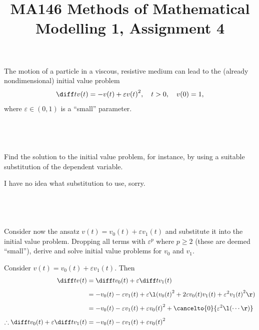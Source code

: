 \documentclass[a4paper]{article}
\title{MA146 Methods of Mathematical Modelling 1, Assignment 4}
\begin{document}
\maketitle

\setlength{\parindent}{0em}
\setlength{\parskip}{1em}


\begin{questionbody}
The motion of a particle in a viscous, resistive medium can lead to the (already nondimensional) initial value problem \[
\diff t v(t) = -v(t) + \varepsilon {v(t)}^2, \quad t > 0, \quad v(0) = 1,
\] where $\varepsilon \in (0, 1)$ is a \enquote{small} parameter.
\end{questionbody}

\subsection{~} %

\begin{questionbody}
Find the solution to the initial value problem, for instance, by using a suitable substitution of the dependent variable.
\end{questionbody}

I have no idea what substitution to use, sorry.

\subsection{~} %

\begin{questionbody}
Consider now the ansatz $v(t) = v_0(t) + \varepsilon v_1(t)$ and substitute it into the initial value problem. Dropping all terms with $\varepsilon^p$ where $p \ge 2$ (these are deemed \enquote{small}), derive and solve initial value problems for $v_0$ and $v_1$.
\end{questionbody}

Consider $v(t) = v_0(t) + \varepsilon v_1(t)$. Then \begin{align*}
    \diff t v(t) &= \diff t v_0(t) + \varepsilon \diff t v_1(t) \\[1ex]
                 &= -v_0(t) - \varepsilon v_1(t) + \varepsilon \l({v_0(t)}^2 + 2 \varepsilon v_0(t) v_1(t) + \varepsilon^2 {v_1(t)}^2 \r) \\[1ex]
                 &= -v_0(t) - \varepsilon v_1(t) + \varepsilon {v_0(t)}^2 + \cancelto{0}{\varepsilon^2 \l(\cdots\r)} \\[1ex]
    \therefore \diff t v_0(t) + \varepsilon \diff t v_1(t) &= -v_0(t) - \varepsilon v_1(t) + \varepsilon {v_0(t)}^2
\end{align*}
\end{document}
